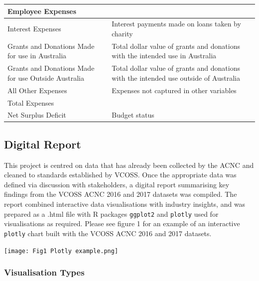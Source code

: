 \documentclass[
  11pt,
]{article}
\let\origfigure\figure
\let\endorigfigure\endfigure
\renewenvironment{figure}[1][2] {
    \expandafter\origfigure\expandafter[H]
} {
    \endorigfigure
}
\begin{document}
\begin{table}[H]
\begin{tabular}{|>{\raggedright\arraybackslash}p{30mm}|>{\raggedright\arraybackslash}p{50mm}|}
\cline{1-1}
Employee Expenses & \multirow{-2}{50mm}{\raggedright\arraybackslash }\\
\cline{1-2}
\rowcolor{gray!6}  Interest Expenses & Interest payments made on loans taken by charity\\
\cline{1-2}
Grants and Donations Made for use in Australia & Total dollar value of grants and donations with the intended use in Australia\\
\cline{1-2}
\rowcolor{gray!6}  Grants and Donations Made for use Outside Australia & Total dollar value of grants and donations with the intended use outside of Australia\\
\cline{1-2}
All Other Expenses & Expenses not captured in other variables\\
\cline{1-2}
\rowcolor{gray!6}  Total Expenses & \\
\cline{1-2}
Net Surplus Deficit & Budget status\\
\hline
\end{tabular}
\endgroup{}
\end{table}

\hypertarget{digital-report}{%
\subsection{Digital Report}\label{digital-report}}

This project is centred on data that has already been collected by the ACNC and cleaned to standards established by VCOSS. Once the appropriate data was defined via discussion with stakeholders, a digital report summarising key findings from the VCOSS ACNC 2016 and 2017 datasets was compiled. The report combined interactive data visualisations with industry insights, and was prepared as a .html file with R packages \texttt{ggplot2} and \texttt{plotly} used for visualisations as required. Please see figure 1 for an example of an interactive \texttt{plotly} chart built with the VCOSS ACNC 2016 and 2017 datasets.

\begin{figure}
\centering
\texttt{[image: Fig1 Plotly example.png]}
\caption{A \texttt{Plotly} interactive plot using the ACNC dataset to visualise funding sources for each main activity}
\end{figure}

\newpage

\hypertarget{visualisation-types}{%
\subsubsection{Visualisation Types}\label{visualisation-types}}
\end{document}

